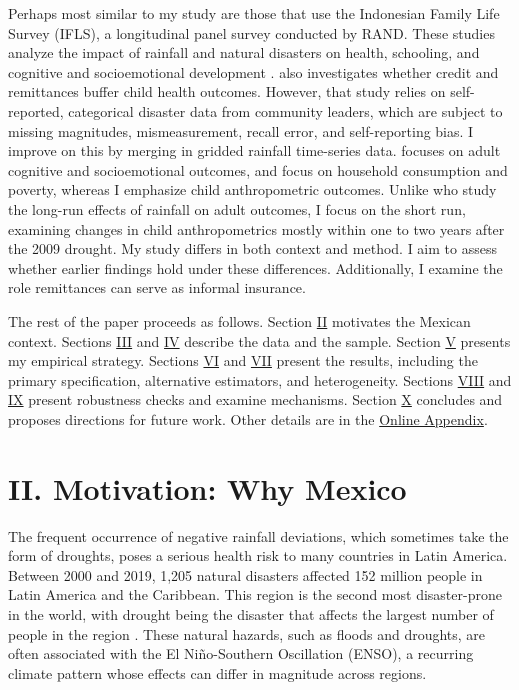 Perhaps most similar to my study are those that use the Indonesian Family Life Survey (IFLS), a longitudinal panel survey conducted by RAND. These studies analyze the impact of rainfall and natural disasters on health, schooling, and cognitive and socioemotional development \parencite{webbCriticalPeriodsCognitive2024,macciniWeatherHealthSchooling2009,thamarapaniNaturalDisastersChild2021}. \textcite{thamarapaniNaturalDisastersChild2021} also investigates whether credit and remittances buffer child health outcomes. However, that study relies on self-reported, categorical disaster data from community leaders, which are subject to missing magnitudes, mismeasurement, recall error, and self-reporting bias. I improve on this by merging in gridded rainfall time-series data. \textcite{webbCriticalPeriodsCognitive2024} focuses on adult cognitive and socioemotional outcomes, and \textcite{adamsEconomicImpactInternational2010} focus on household consumption and poverty, whereas I emphasize child anthropometric outcomes. Unlike \textcite{macciniWeatherHealthSchooling2009} who study the long-run effects of rainfall on adult outcomes, I focus on the short run, examining changes in child anthropometrics mostly within one to two years after the 2009 drought. My study differs in both context and method. I aim to assess whether earlier findings hold under these differences. Additionally, I examine the role remittances can serve as informal insurance.

The rest of the paper proceeds as follows. Section \hyperref[sec:II]{II} motivates the Mexican context. Sections \hyperref[sec:III]{III} and \hyperref[sec:IV]{IV} describe the data and the sample. Section \hyperref[sec:V]{V} presents my empirical strategy. Sections \hyperref[sec:VI]{VI} and \hyperref[sec:VII]{VII} present the results, including the primary specification, alternative estimators, and heterogeneity. Sections \hyperref[sec:VIII]{VIII} and \hyperref[sec:IX]{IX} present robustness checks and examine mechanisms. Section \hyperref[sec:X]{X} concludes and proposes directions for future work. Other details are in the \href{Online_Appendix.pdf}{Online Appendix}.

\section*{II. Motivation: Why Mexico}\label{sec:II}

The frequent occurrence of negative rainfall deviations, which sometimes take the form of droughts, poses a serious health risk to many countries in Latin America. Between 2000 and 2019, 1,205 natural disasters affected 152 million people in Latin America and the Caribbean. This region is the second most disaster-prone in the world, with drought being the disaster that affects the largest number of people in the region \parencite{ochaNaturalDisastersLatin2020}. These natural hazards, such as floods and droughts, are often associated with the El Ni\~no-Southern Oscillation (ENSO), a recurring climate pattern whose effects can differ in magnitude across regions.

